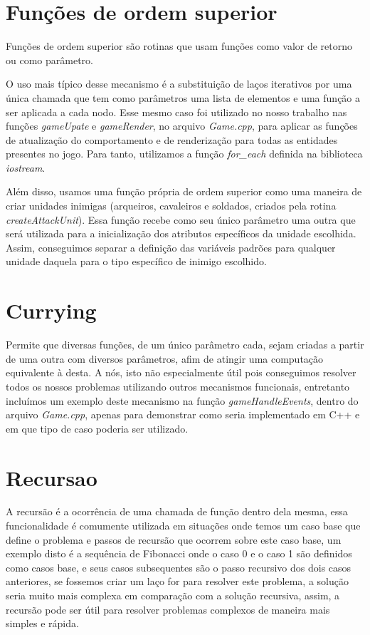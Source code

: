\documentclass[rel_mlp]{iiufrgs}
\begin{document}
 \section{Funções de ordem superior}

	Funções de ordem superior são rotinas que usam funções como valor de retorno ou como parâmetro.

	O uso mais típico desse mecanismo é a substituição de laços iterativos por uma única chamada que tem como parâmetros uma lista de elementos e uma função a ser aplicada a cada nodo. Esse mesmo caso foi utilizado no nosso trabalho nas funções \textit{gameUpate} e \textit{gameRender}, no arquivo \textit{Game.cpp}, para aplicar as funções de atualização do comportamento e de renderização para todas as entidades presentes no jogo. Para tanto, utilizamos a função \textit{for\_each}	definida na biblioteca \textit{iostream}.

	Além disso, usamos uma função própria de ordem superior como uma maneira de criar unidades inimigas (arqueiros, cavaleiros e soldados, criados pela rotina \textit{createAttackUnit}). Essa função recebe como seu único parâmetro uma outra que será utilizada para a inicialização dos atributos específicos da unidade escolhida. Assim, conseguimos separar a definição das variáveis padrões para qualquer unidade daquela para o tipo específico de inimigo escolhido.

 \section{Currying}
 
	Permite que diversas funções, de um único parâmetro cada, sejam criadas a partir de uma outra com diversos parâmetros, afim de atingir uma computação equivalente à desta. A nós, isto não especialmente útil pois conseguimos resolver todos os nossos problemas utilizando outros mecanismos funcionais, entretanto incluímos um exemplo deste mecanismo na função \textit{gameHandleEvents}, dentro do arquivo \textit{Game.cpp}, apenas para demonstrar como seria implementado em C++ e em que tipo de caso poderia ser utilizado.
	
 \section{Recursao}
 
 A recursão é a ocorrência de uma chamada de função dentro dela mesma, essa funcionalidade é comumente utilizada em situações onde temos um caso base que define o problema e passos de recursão que ocorrem sobre este caso base, um exemplo disto é a sequência de  Fibonacci onde o caso 0 e o caso 1 são definidos como casos base, e seus casos subsequentes são o passo recursivo dos dois casos anteriores, se fossemos criar um laço for para resolver este problema, a solução seria muito mais complexa em comparação com a solução recursiva, assim, a recursão pode ser útil para resolver problemas complexos de maneira mais simples e rápida.
 
\end{document}
